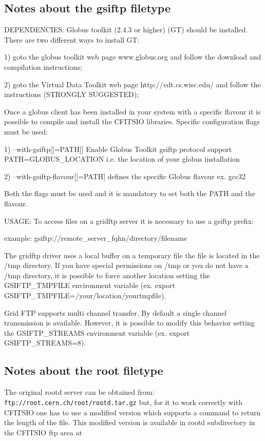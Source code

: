 \documentclass[11pt]{book}
\begin{document}
\subsection{Notes about the gsiftp filetype}

DEPENDENCIES: Globus toolkit (2.4.3 or higher) (GT) should be installed.
There are two different ways to install GT:

1) goto the globus toolkit web page www.globus.org and follow the
   download and compilation instructions;

2) goto the Virtual Data Toolkit web page http://vdt.cs.wisc.edu/
   and follow the instructions (STRONGLY SUGGESTED);

Once a globus client has been installed in your system with a specific flavour
it is possible to compile and install the CFITSIO libraries.
Specific configuration flags must be used:

1)  --with-gsiftp[[=PATH]] Enable Globus Toolkit gsiftp protocol support
    PATH=GLOBUS\_LOCATION i.e. the location of your globus installation

2)  --with-gsiftp-flavour[[=PATH] defines the specific Globus flavour
        ex. gcc32

Both the flags must be used and it is mandatory to set  both the PATH and the
flavour.

USAGE: To access files on a gridftp server it is necessary to use a gsiftp prefix:

example: gsiftp://remote\_server\_fqhn/directory/filename

The gridftp driver uses a local buffer on a temporary file the file is located
in the /tmp directory. If you have special permissions on /tmp or you do not have a /tmp
directory, it is possible to force another location setting the GSIFTP\_TMPFILE environment
variable (ex. export GSIFTP\_TMPFILE=/your/location/yourtmpfile).

Grid FTP supports multi channel transfer. By default a single channel transmission is
available. However, it is possible to modify this behavior setting the GSIFTP\_STREAMS
environment variable (ex. export GSIFTP\_STREAMS=8).



\subsection{Notes about the root filetype}

The original rootd server can be obtained from:
\verb-ftp://root.cern.ch/root/rootd.tar.gz-
but, for it to work correctly with CFITSIO one has to use a modified
version which supports a command to return the length of the file.
This modified version is available in rootd subdirectory
in the CFITSIO ftp area at
\end{document}
